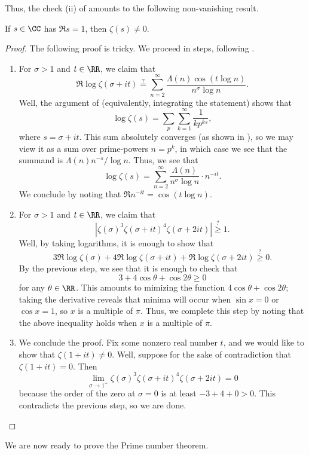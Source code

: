 \documentclass[../thesis.tex]{subfiles}
\begin{document}
Thus, the check (ii) of  amounts to the following non-vanishing result.
\begin{proposition} \label{prop:zeta-nonvanish}
	If $s\in\CC$ has $\Re s=1$, then $\zeta(s)\ne0$.
\end{proposition}
\begin{proof}
	The following proof is tricky. We proceed in steps, following \cite[Section~3.2]{murty-analytic-nt}.
	\begin{enumerate}
		\item For $\sigma>1$ and $t\in\RR$, we claim that
		\[\Re\log\zeta(\sigma+it)\stackrel?=\sum_{n=2}^\infty\frac{\Lambda(n)\cos(t\log n)}{n^\sigma\log n}.\]
		Well, the argument of  (equivalently, integrating the statement) shows that
		\[\log\zeta(s)=\sum_p\sum_{k=1}^\infty\frac1{kp^{ks}},\]
		where $s=\sigma+it$. This sum absolutely converges (as shown in ), so we may view it as a sum over prime-powers $n=p^k$, in which case we see that the summand is $\Lambda(n)n^{-s}/\log n$. Thus, we see that
		\[\log\zeta(s)=\sum_{n=2}^\infty\frac{\Lambda(n)}{n^\sigma\log n}\cdot n^{-it}.\]
		We conclude by noting that $\Re n^{-it}=\cos(t\log n)$.
		\item For $\sigma>1$ and $t\in\RR$, we claim that
		\[\left|\zeta(\sigma)^3\zeta(\sigma+it)^4\zeta(\sigma+2it)\right|\stackrel?\ge1.\]
		Well, by taking logarithms, it is enough to show that
		\[3\Re\log\zeta(\sigma)+4\Re\log\zeta(\sigma+it)+\Re\log\zeta(\sigma+2it)\stackrel?\ge0.\]
		By the previous step, we see that it is enough to check that
		\[3+4\cos\theta+\cos2\theta\ge0\]
		for any $\theta\in\RR$. This amounts to mimizing the function $4\cos\theta+\cos2\theta$; taking the derivative reveals that minima will occur when $\sin x=0$ or $\cos x=1$, so $x$ is a multiple of $\pi$. Thus, we complete this step by noting that the above inequality holds when $x$ is a multiple of $\pi$.
		\item We conclude the proof. Fix some nonzero real number $t$, and we would like to show that $\zeta(1+it)\ne0$. Well, suppose for the sake of contradiction that $\zeta(1+it)=0$. Then
		\[\lim_{\sigma\to1^+}\zeta(\sigma)^3\zeta(\sigma+it)^4\zeta(\sigma+2it)=0\]
		because the order of the zero at $\sigma=0$ is at least $-3+4+0>0$. This contradicts the previous step, so we are done.
		\qedhere
	\end{enumerate}
\end{proof}
We are now ready to prove the Prime number theorem.
\end{document}
